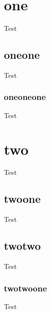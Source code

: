 \documentclass[a4paper, 11pt]{article}
\begin{document}
\tableofcontents

\section{one}
Test

\subsection{oneone}
Test

\subsubsection{oneoneone}
Test

\section{two}
Test

\newpage

\subsection{twoone}
Test

\subsection{twotwo}
Test

\newpage

\subsubsection{twotwoone}
Test
\end{document}
